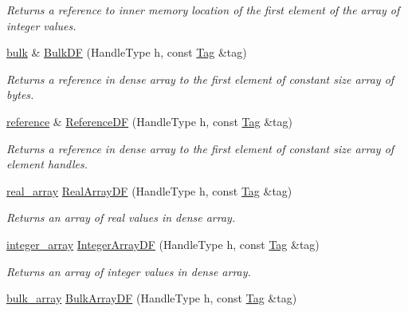 \begin{DoxyCompactItemize}
\begin{DoxyCompactList}\small\item\em Returns a reference to inner memory location of the first element of the array of integer values. \end{DoxyCompactList}\item 
\hyperlink{classINMOST_1_1Storage_ae429556af77094077d212e0ac23c8cfc}{bulk} \& \hyperlink{classINMOST_1_1Mesh_a88229181252531147051badf5a05e263}{Bulk\-D\-F} (Handle\-Type h, const \hyperlink{classINMOST_1_1Tag}{Tag} \&tag)
\begin{DoxyCompactList}\small\item\em Returns a reference in dense array to the first element of constant size array of bytes. \end{DoxyCompactList}\item 
\hyperlink{classINMOST_1_1Storage_a8674802045ec170a3c9d0e3281545b54}{reference} \& \hyperlink{classINMOST_1_1Mesh_ab5abf1a33ab21a0c60338a97287fc115}{Reference\-D\-F} (Handle\-Type h, const \hyperlink{classINMOST_1_1Tag}{Tag} \&tag)
\begin{DoxyCompactList}\small\item\em Returns a reference in dense array to the first element of constant size array of element handles. \end{DoxyCompactList}\item 
\hyperlink{classINMOST_1_1Storage_a430e5358d435befb38169beef593527e}{real\-\_\-array} \hyperlink{classINMOST_1_1Mesh_a8527fa3c2f6ece108b5abce389566365}{Real\-Array\-D\-F} (Handle\-Type h, const \hyperlink{classINMOST_1_1Tag}{Tag} \&tag)
\begin{DoxyCompactList}\small\item\em Returns an array of real values in dense array. \end{DoxyCompactList}\item 
\hyperlink{classINMOST_1_1Storage_a4d1637367f0487eb778894b57fc94647}{integer\-\_\-array} \hyperlink{classINMOST_1_1Mesh_a9d5351b2b6e7f7824598cb46b3c35118}{Integer\-Array\-D\-F} (Handle\-Type h, const \hyperlink{classINMOST_1_1Tag}{Tag} \&tag)
\begin{DoxyCompactList}\small\item\em Returns an array of integer values in dense array. \end{DoxyCompactList}\item 
\hyperlink{classINMOST_1_1Storage_a6e49b2a38cb55dd59529bd23e8b1b852}{bulk\-\_\-array} \hyperlink{classINMOST_1_1Mesh_a53d63f6a251db48695306180f22ff67e}{Bulk\-Array\-D\-F} (Handle\-Type h, const \hyperlink{classINMOST_1_1Tag}{Tag} \&tag)

\end{DoxyCompactItemize}
